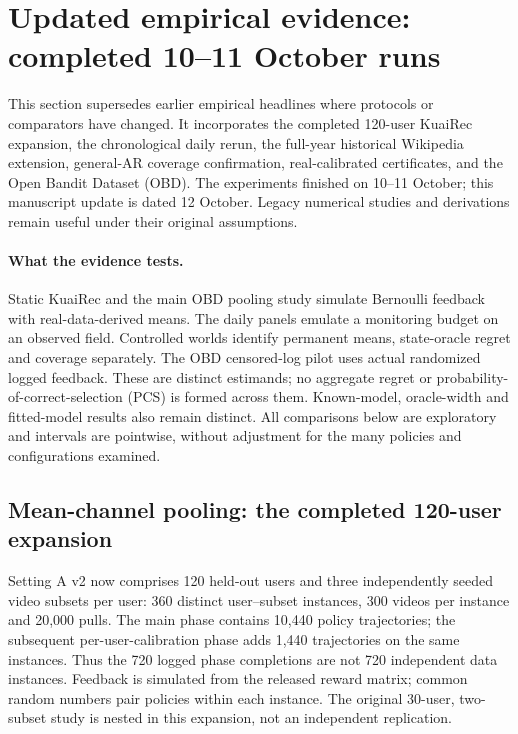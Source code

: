 \section{Updated empirical evidence: completed 10--11 October runs}
\label{sec:latest}
\newsavebox{\latestTableBox}
\makeatletter
\setlength{\@fptop}{0pt}
\setlength{\@fpsep}{14pt}
\makeatother

This section supersedes earlier empirical headlines where protocols or comparators have changed. It incorporates the completed 120-user KuaiRec expansion, the chronological daily rerun, the full-year historical Wikipedia extension, general-AR coverage confirmation, real-calibrated certificates, and the Open Bandit Dataset (OBD). The experiments finished on 10--11 October; this manuscript update is dated 12 October. Legacy numerical studies and derivations remain useful under their original assumptions.

\paragraph{What the evidence tests.} Static KuaiRec and the main OBD pooling study simulate Bernoulli feedback with real-data-derived means. The daily panels emulate a monitoring budget on an observed field. Controlled worlds identify permanent means, state-oracle regret and coverage separately. The OBD censored-log pilot uses actual randomized logged feedback. These are distinct estimands; no aggregate regret or probability-of-correct-selection (PCS) is formed across them. Known-model, oracle-width and fitted-model results also remain distinct. All comparisons below are exploratory and intervals are pointwise, without adjustment for the many policies and configurations examined.

\subsection{Mean-channel pooling: the completed 120-user expansion}

Setting A v2 now comprises 120 held-out users and three independently seeded video subsets per user: 360 distinct user--subset instances, 300 videos per instance and 20,000 pulls. The main phase contains 10,440 policy trajectories; the subsequent per-user-calibration phase adds 1,440 trajectories on the same instances. Thus the 720 logged phase completions are not 720 independent data instances. Feedback is simulated from the released reward matrix; common random numbers pair policies within each instance. The original 30-user, two-subset study is nested in this expansion, not an independent replication.

